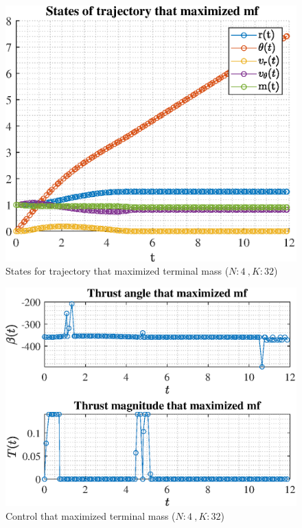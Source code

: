 \documentclass[]{article}
\begin{document}
	\begin{figure}
		\centering
		\includegraphics[scale=0.75]{states_N4_K32_C2_mf.eps}
		\caption{States for trajectory that maximized terminal mass (\(N:4\ , K:32\))}
		\label{fig:states_N4_K32_C2_mf}
	\end{figure}
	\begin{figure}
		\centering
		\includegraphics[scale=0.75]{control_N4_K32_C2_mf.eps}
		\caption{Control that maximized terminal mass (\(N:4\ , K:32\))}
		\label{fig:control_N4_K32_C2_mf}
	\end{figure}
\end{document}
